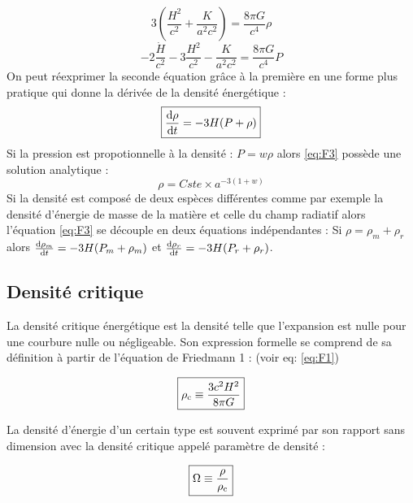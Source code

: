 \documentclass[10pt, a4paper]{report}
\numberwithin{equation}{subsection}
\begin{document}
\begin{equation} \label{eq:F1}
\boxed{3 \left(\frac{H^2}{c^2} + \frac{K}{a^2 c^2} \right) = \frac{8 \pi G}{c^4} \rho}
\end{equation}
\begin{equation} \label{eq:F2}
\boxed{- 2 \frac{\dot H}{c^2} - 3 \frac{H^2}{c^2} - \frac{K}{a^2 c^2} =  \frac{8 \pi G}{c^4} P }
\end{equation}
On peut réexprimer la seconde équation grâce à la première en une forme plus pratique qui donne la dérivée de la densité énergétique :
\begin{equation} \label{eq:F3}
\boxed{\frac{{\rm d}\rho}{{\rm d}t} = - 3 H (P + \rho) }
\end{equation}
Si la pression est propotionnelle à la densité : $P= w \rho$ alors \ref{eq:F3} possède une solution analytique :
\begin{equation} \label{eq:F3S}
\boxed{\rho = Cste \times a^{-3(1+w)}}
\end{equation}
Si la densité est composé de deux espèces différentes comme par exemple la densité d'énergie de masse de la matière et celle du champ radiatif alors l'équation \ref{eq:F3} se découple en deux équations indépendantes : Si $\rho = \rho_m + \rho_r$ alors $\frac{{\rm d}\rho_m}{{\rm d}t} = - 3 H (P_m + \rho_m) $ et $\frac{{\rm d}\rho_r}{{\rm d}t} = - 3 H (P_r + \rho_r)$.



\subsection{Densité critique}
La densité critique énergétique est la densité telle que l'expansion est nulle pour une courbure nulle ou négligeable. Son expression formelle se comprend de sa définition à partir de l'équation de Friedmann 1 : (voir eq: \ref{eq:F1})

\begin{equation} \label{eq:DEC}
\boxed{\rho_{\rm c} \equiv \frac{3 c^2 H^2 }{8 \pi G} }
\end{equation}

La densité d'énergie d'un certain type est souvent exprimé par son rapport sans dimension avec la densité critique appelé paramètre de densité :

\begin{equation} \label{eq:OD}
\boxed{\Omega \equiv \frac{\rho}{\rho_{\rm c}} }
\end{equation}
\end{document}
